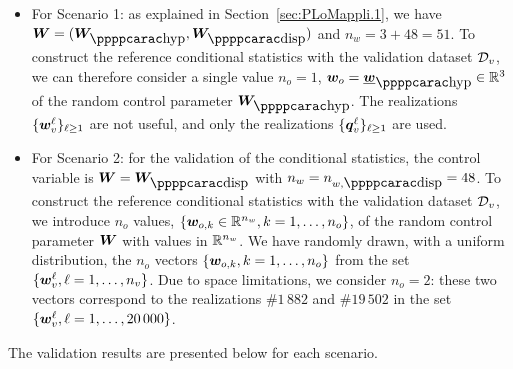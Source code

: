 \begin{itemize}
    \item For Scenario 1: as explained in  Section~\ref{sec:PLoMappli.1}, we have $\bfW = (\bfW_\hypp,\bfW_\dispp)$ and $n_w = 3+48=51$. To construct the reference conditional statistics with the validation dataset ${\mathcal{D}}_v$, we can therefore consider a single value $n_o=1$, $\bfw_{o} = \underline{\bfw}_\hypp\in\RR^3$  of the random control parameter $\bfW_\hypp$. The realizations $\{{\boldsymbol{w}}_v^\ell\}_{\ell \geq 1}$ are not useful, and only the realizations $\{{\boldsymbol{q}}_v^\ell\}_{\ell \geq 1}$ are used.
    \item For Scenario 2: for the validation of the conditional statistics, the control variable is $\bfW=\bfW_\dispp$ with $n_w = n_{w,\dispp} = 48$. To construct the reference conditional statistics with the validation dataset ${\mathcal{D}}_v$, we introduce $n_o$ values, $\{{\boldsymbol{w}}_{o,k}\in{\mathbb{R}}^{n_w}, k=1,\ldots, n_o\}$, of the random control parameter ${\boldsymbol{W}}$ with values in ${\mathbb{R}}^{n_w}$. We have randomly drawn, with a uniform distribution, the $n_o$ vectors $\{{\boldsymbol{w}}_{o,k}, k=1,\ldots, n_o\}$ from the set $\{{\boldsymbol{w}}_v^\ell, \ell=1,\ldots,n_v\}$. Due to space limitations, we consider $n_o = 2$: these two vectors correspond to the realizations $\# 1\,882$ and $\# 19\,502$ in the set $\{{\boldsymbol{w}}_v^\ell, \ell=1,\ldots,20\,000\}$.
\end{itemize}
The validation results are presented below for each scenario.

